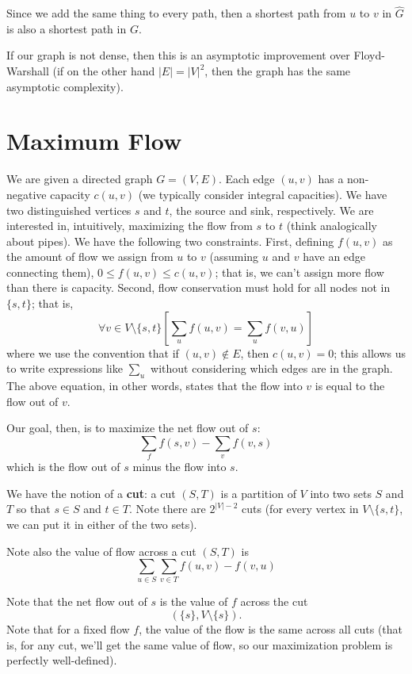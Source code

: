\documentclass{article}
\begin{document}
Since we add the same thing to every path, then a shortest path from
$u$ to $v$ in $\widehat G$ is also a shortest path in $G$.

If our graph is not dense, then this is an asymptotic improvement over
Floyd-Warshall (if on the other hand $|E| = |V|^2$, then the graph
has the same asymptotic complexity).


\section{Maximum Flow}

We are given a directed graph $G=(V,E)$.
Each edge $(u,v)$ has a non-negative capacity $c(u,v)$ (we typically
consider integral capacities).
We have two distinguished vertices $s$ and $t$, the source and sink, 
respectively.
We are interested in, intuitively, maximizing the flow from $s$ to $t$
(think analogically about pipes).
We have the following two constraints.
First, defining $f(u,v)$ as the amount of flow we assign from $u$ to $v$
(assuming $u$ and $v$ have an edge connecting them), 
$0\leq f(u,v) \leq c(u,v)$; that is, we can't assign more flow than there
is capacity.
Second, flow conservation must hold for all nodes not in $\{s,t\}$; that is,
$$
\forall v\in V\setminus \{s,t\}
\left[
	\sum_u f(u,v) = \sum_u f(v,u)
\right]
$$
where we use the convention that if $(u,v)\not\in E$, then $c(u,v) = 0$;
this allows us to write expressions like $\sum_u$ without considering
which edges are in the graph.
The above equation, in other words, states that the flow into $v$
is equal to the flow out of $v$.

Our goal, then, is to maximize the net flow out of $s$:
$$
\sum_f f(s,v) - \sum_v f(v,s)
$$
which is the flow out of $s$ minus the flow into $s$.

We have the notion of a \textbf{cut}: a cut $(S,T)$ is a partition of
$V$ into two sets $S$ and $T$ so that $s\in S$ and $t\in T$.
Note there are $2^{|V| - 2}$ cuts (for every vertex in $V\setminus \{s,t\}$,
we can put it in either of the two sets).

Note also the value of flow across a cut $(S,T)$ is
$$
\sum_{u\in S} \sum_{v\in T}
	f(u,v) - f(v,u)
$$

Note that the net flow out of $s$ is the value of $f$ across the cut
$$
\left(\{s\}, V\setminus \{s\}\right).
$$
Note that for a fixed flow $f$, the value of the flow is the same
across all cuts (that is, for any cut, we'll get the same value of flow,
so our maximization problem is perfectly well-defined).
\end{document}
